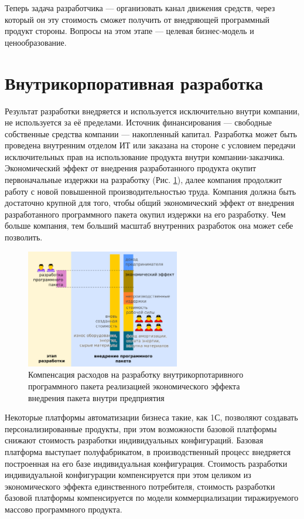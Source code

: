 \documentclass{article}
\begin{document}
Теперь задача разработчика — организовать канал движения средств, через который он эту стоимость сможет получить от внедряющей программный продукт стороны. Вопросы на этом этапе — целевая бизнес-модель и ценообразование.

\section*{Внутрикорпоративная разработка}

Результат разработки внедряется и используется исключительно внутри компании, не используется за её пределами. Источник финансирования — свободные собственные средства компании — накопленный капитал. Разработка может быть проведена внутренним отделом ИТ или заказана на стороне с условием передачи исключительных прав на использование продукта внутри компании-заказчика. Экономический эффект от внедрения разработанного продукта окупит первоначальные издержки на разработку (Рис. \ref{fig:model_eco_effect_corporate}), далее компания продолжит работу с новой повышенной производительностью труда. Компания должна быть достаточно крупной для того, чтобы общий экономический эффект от внедрения разработанного программного пакета окупил издержки на его разработку. Чем больше компания, тем больший масштаб внутренних разработок она может себе позволить.

\begin{figure}[h]
    \centering
    \includegraphics[width=0.6\textwidth]{model-eco-effect-corporate}
    \caption{Компенсация расходов на разработку внутрикорпотаривного программного пакета реализацией экономического эффекта внедрения пакета внутри предприятия}
    \label{fig:model_eco_effect_corporate}
\end{figure}

Некоторые платформы автоматизации бизнеса такие, как 1С, позволяют создавать персонализированные продукты, при этом возможности базовой платформы снижают стоимость разработки индивидуальных конфигураций. Базовая платформа выступает полуфабрикатом, в производственный процесс внедряется построенная на его базе индивидуальная конфигурация. Стоимость разработки индивидуальной конфигурации компенсируется при этом целиком из экономического эффекта единственного потребителя, стоимость разработки базовой платформы компенсируется по модели коммерциализации тиражируемого массово программного продукта.
\end{document}
